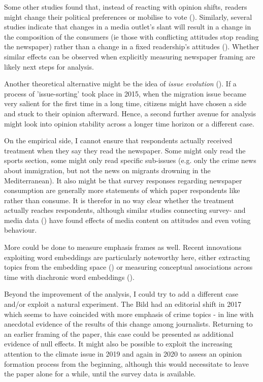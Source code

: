 \documentclass{article}
\begin{document}
Some other studies found that, instead of reacting with opinion shifts, readers might change their political preferences or mobilise to vote (\cite{Stetka2020}). Similarly, several studies indicate that changes in a media outlet's slant will result in a change in the composition of the consumers (ie those with conflicting attitudes stop reading the newspaper) rather than a change in a fixed readership's attitudes (\cite{Arceneaux2013, Durante2012, Spirig2020}). Whether similar effects can be observed when explicitly measuring newspaper framing are likely next steps for analysis.

Another theoretical alternative might be the idea of \textit{issue evolution} (\cite{Carmines1986}). If a process of 'issue-sorting' took place in 2015, when the migration issue became very salient for the first time in a long time, citizens might have chosen a side and stuck to their opinion afterward. Hence, a second further avenue for analysis might look into opinion stability across a longer time horizon or a different case.

On the empirical side, I cannot ensure that respondents actually received treatment when they say they read the newspaper. Some might only read the sports section, some might only read specific sub-issues (e.g. only the crime news about immigration, but not the news on migrants drowning in the Mediterranean). It also might be that survey responses regarding newspaper consumption are generally more statements of which paper respondents like rather than consume. It is therefor in no way clear whether the treatment actually reaches respondents, although similar studies connecting survey- and media data (\cite{Eberl2015}) have found effects of media content on attitudes and even voting behaviour.

More could be done to measure emphasis frames as well. Recent innovations exploiting word embeddings are particularly noteworthy here, either extracting topics from the embedding space (\cite{Angelov2020, Urman2021}) or measuring conceptual associations across time with diachronic word embeddings (\cite{Rodman2019}).

Beyond the improvement of the analysis, I could try to add a different case and/or exploit a natural experiment. The Bild had an editorial shift in 2017 which seems to have coincided with more emphasis of crime topics - in line with anecdotal evidence of the results of this change among journalists. Returning to an earlier framing of the paper, this case could be presented as additional evidence of null effects. It might also be possible to exploit the increasing attention to the climate issue in 2019 and again in 2020 to assess an opinion formation process from the beginning, although this would necessitate to leave the paper alone for a while, until the survey data is available.
\end{document}
